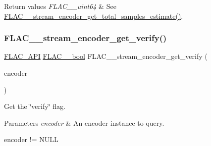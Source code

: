 \begin{DoxyRetVals}{Return values}
{\em F\+L\+A\+C\+\_\+\+\_\+uint64} & See \hyperlink{group__flac__stream__encoder_ga8b206187a5b2a261ad4b5067fa43525b}{F\+L\+A\+C\+\_\+\+\_\+stream\+\_\+encoder\+\_\+get\+\_\+total\+\_\+samples\+\_\+estimate()}. \\
\hline
\end{DoxyRetVals}
\mbox{\label{group__flac__stream__encoder_ga044d18f93fa8faa6a85eec4fa7cf86f2}} 
\subsubsection{\texorpdfstring{F\+L\+A\+C\+\_\+\+\_\+stream\+\_\+encoder\+\_\+get\+\_\+verify()}{FLAC\_\_stream\_encoder\_get\_verify()}}
{\footnotesize\ttfamily \hyperlink{group__flac__export_ga56ca07df8a23310707732b1c0007d6f5}{F\+L\+A\+C\+\_\+\+A\+PI} \hyperlink{ordinals_8h_a95103469f1cbd78b8cf250194985b34e}{F\+L\+A\+C\+\_\+\+\_\+bool} F\+L\+A\+C\+\_\+\+\_\+stream\+\_\+encoder\+\_\+get\+\_\+verify (\begin{DoxyParamCaption}\item[{\hyperlink{zconf_8h_a2c212835823e3c54a8ab6d95c652660e}{const} \hyperlink{struct_f_l_a_c_____stream_encoder}{F\+L\+A\+C\+\_\+\+\_\+\+Stream\+Encoder} $\ast$}]{encoder }\end{DoxyParamCaption})}

Get the \char`\"{}verify\char`\"{} flag.


\begin{DoxyParams}{Parameters}
{\em encoder} & An encoder instance to query.  
\begin{DoxyCode}
encoder != NULL 
\end{DoxyCode}
 \\
\hline
\end{DoxyParams}

